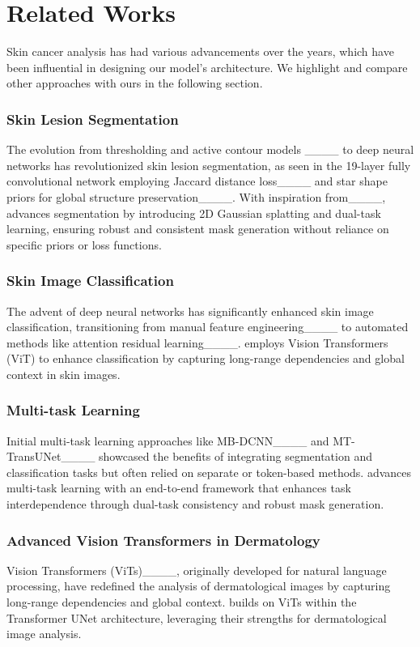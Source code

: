 \section{Related Works}
Skin cancer analysis has had various advancements over the years, which have been influential in designing our model's architecture. We highlight and compare other approaches with ours in the following section.

\subsubsection{Skin Lesion Segmentation}
The evolution from thresholding and active contour models ____ to deep neural networks has revolutionized skin lesion segmentation, as seen in the 19-layer fully convolutional network employing Jaccard distance loss____ and star shape priors for global structure preservation____. With inspiration from____, \ours advances segmentation by introducing 2D Gaussian splatting and dual-task learning, ensuring robust and consistent mask generation without reliance on specific priors or loss functions.

\subsubsection{Skin Image Classification}
The advent of deep neural networks has significantly enhanced skin image classification, transitioning from manual feature engineering____ to automated methods like attention residual learning____. \ours employs Vision Transformers (ViT) to enhance classification by capturing long-range dependencies and global context in skin images.

\subsubsection{Multi-task Learning}
Initial multi-task learning approaches like MB-DCNN____ and MT-TransUNet____ showcased the benefits of integrating segmentation and classification tasks but often relied on separate or token-based methods. \ours advances multi-task learning with an end-to-end framework that enhances task interdependence through dual-task consistency and robust mask generation.

\subsubsection{Advanced Vision Transformers in Dermatology}
Vision Transformers (ViTs)____, originally developed for natural language processing, have redefined the analysis of dermatological images by capturing long-range dependencies and global context. \ours builds on ViTs within the Transformer UNet architecture, leveraging their strengths for dermatological image analysis.

